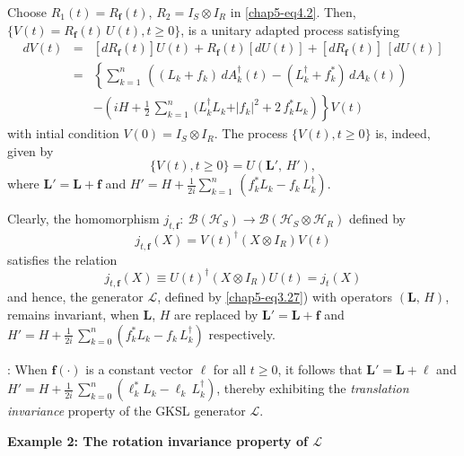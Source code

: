 Choose $R_1(t)=R_{\mathbf{f}}(t)$, $R_2=I_S\otimes I_R$ in \eqref{chap5-eq4.2}.  Then, $\{V(t)=R_{\mathbf{f}}(t)\,U(t), t\geq 0\}$,  is a unitary adapted process satisfying     
\begin{eqnarray}
dV(t)&=& \left[ dR_{\mathbf{f}}(t)\right] U(t)+ R_{\mathbf{f}}(t) \left[ dU(t)\right]+\left[ dR_{\mathbf{f}}(t) \right]\,  
\left[dU(t)\right] \nonumber \\ 
&=& \left\{\sum_{k=1}^n\, \left((L_k+f_k)\, dA^\dag_k(t) - (L^\dag_k+f^*_k)\, dA_k(t) \right) \right.\nonumber \\ 
&&  \left. - \left(iH+\frac{1}{2}\, 
\sum_{k=1}^n\,(L_k^\dag L_k+ \vert f_{k}\vert^2 + 2\, f_k^*L_k\right) \right\}\! V(t) \label{chap5-eq4.10}
\end{eqnarray}    
with intial condition $V(0)=I_S\otimes I_R$. The process $\{V(t), t\geq 0\}$ is, indeed, given by 
$$
\{V(t), t\geq 0\}=U\left(\mathbf{L}',\, H'\right),
$$
where  $\mathbf{L}'=\mathbf{L}+\mathbf{f}$ and $H'=H+\frac{1}{2i}\sum_{k=1}^n\, \left(f_k^*L_k-f_k\, L_k^\dag\right).$    

Clearly, the homomorphism $j_{t,\mathbf{f}}:  \ \mathcal{B}(\mathcal{H}_S)\longrightarrow 
\mathcal{B}(\mathcal{H}_S\otimes\mathcal{H}_R)$ defined by  
$$
j_{t,\mathbf{f}} (X) = V(t)^{\dagger} (X \otimes I_R)  V(t)
$$
satisfies the relation 
$$
j_{t,\mathbf{f}} (X)\equiv U(t)^{\dagger} (X \otimes I_R)  U(t)=j_t(X)
$$  
and hence,  the generator $\mathcal{L}$,  defined by \eqref{chap5-eq3.27}) with operators $(\mathbf{L},\, H)$, remains invariant, when $\mathbf{L}$, $H$ are replaced by $\mathbf{L}'=\mathbf{L}+\mathbf{f}$ and $H'=H+\frac{1}{2i}\, \displaystyle\sum_{k=0}^{n}(f_k^*L_k-f_k\, L_k^\dag)$ respectively. 

: When $\mathbf{f}(\cdot)$ is a constant vector $\pmb{\ell}$ for all $t\geq 0$, it follows that $\mathbf{L}'=\mathbf{L}+\pmb{\ell}$ and $H'=H+\frac{1}{2i}\, \displaystyle\sum_{k=0}^{n}(\ell_k^*L_k-\ell_k\, L_k^\dag)$, thereby exhibiting the {\em translation invariance} property of the GKSL generator $\mathcal{L}$. 

\medskip 
\noindent \textbf{\large Example 2: The rotation invariance property of $\mathcal{L}$} 
\medskip

